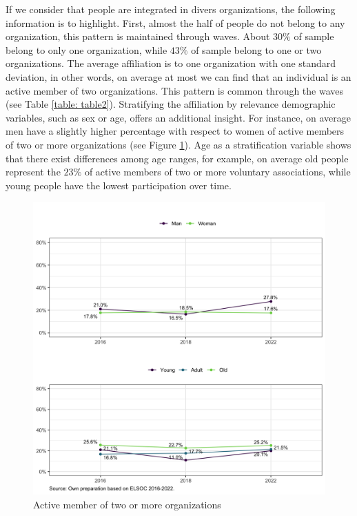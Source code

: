 If we consider that people are integrated in divers organizations, the following information is to highlight. First, almost the half of people do not belong to any organization, this pattern is maintained through waves. About $30\%$ of sample belong to only one organization, while $43\%$ of sample belong to one or two organizations. The average affiliation is to one organization with one standard deviation, in other words, on average at most we can find that an individual is an active member of two organizations. This pattern is common through the waves (see Table \ref{table: table2}). Stratifying the affiliation by relevance demographic variables, such as sex or age, offers an additional insight. For instance, on average men have a slightly higher percentage with respect to women of active members of two or more organizations (see Figure \ref{fig:fig9}). Age as a stratification variable shows that there exist differences among age ranges, for example, on average old people represent the $23\%$ of active members of two or more voluntary associations, while young people have the lowest participation over time.

\begin{figure}[H]
    \centering
    \includegraphics[width=16cm]{output/fig9.png}
    \caption{Active member of two or more organizations}
    \label{fig:fig9}
\end{figure}


